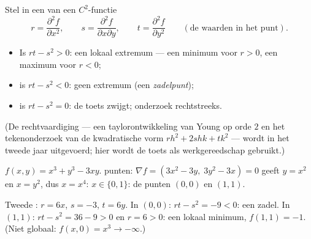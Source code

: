 \begin{method}\label{met:b1:multivar:monge}
Stel in een  van een $C^2$-functie
\[
r = \frac{\partial^2 f}{\partial x^2},
\qquad
s = \frac{\partial^2 f}{\partial x \partial y},
\qquad
t = \frac{\partial^2 f}{\partial y^2}
\qquad (\text{de waarden in het punt}).
\]
\begin{itemize}
  \item Is $rt - s^2 > 0$: een lokaal extremum --- een minimum voor
        $r > 0$, een maximum voor $r < 0$;
  \item is $rt - s^2 < 0$: geen extremum (een
        \emph{zadelpunt});
  \item is $rt - s^2 = 0$: de toets zwijgt; onderzoek
        rechtstreeks.
\end{itemize}
(De rechtvaardiging --- een taylorontwikkeling van Young op orde
$2$ en het tekenonderzoek van de kwadratische vorm $r h^2 + 2shk +
tk^2$ --- wordt in het tweede jaar uitgevoerd; hier wordt de toets
als werkgereedschap gebruikt.)
\end{method}

\begin{example}\label{ex:b1:multivar:extrema}
$f(x,y) = x^3 + y^3 - 3xy$.  punten: $\nabla f = (3x^2 -
3y,\; 3y^2 - 3x) = 0$ geeft $y = x^2$ en $x = y^2$, dus $x = x^4$:
$x \in \{0, 1\}$: de punten $(0,0)$ en $(1,1)$.

Tweede : $r = 6x$, $s = -3$, $t = 6y$. In $(0,0)$: $rt -
s^2 = -9 < 0$: een zadel. In $(1,1)$: $rt - s^2 = 36 - 9 > 0$ en $r
= 6 > 0$: een lokaal minimum, $f(1,1) = -1$. (Niet globaal: $f(x,
0) = x^3 \to -\infty$.)
\end{example}

